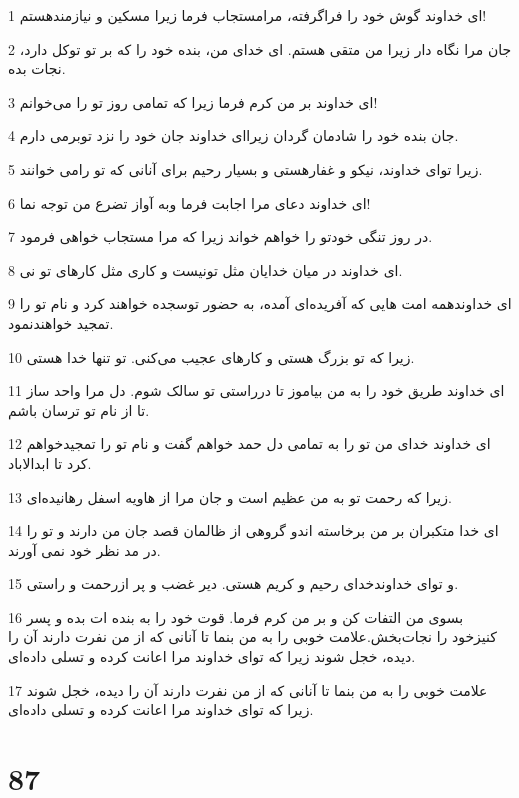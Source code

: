 \par 1 ای خداوند گوش خود را فراگرفته، مرامستجاب فرما زیرا مسکین و نیازمندهستم!
\par 2 جان مرا نگاه دار زیرا من متقی هستم. ای خدای من، بنده خود را که بر تو توکل دارد، نجات بده.
\par 3 ‌ای خداوند بر من کرم فرما زیرا که تمامی روز تو را می‌خوانم!
\par 4 جان بنده خود را شادمان گردان زیرا‌ای خداوند جان خود را نزد توبرمی دارم.
\par 5 زیرا تو‌ای خداوند، نیکو و غفارهستی و بسیار رحیم برای آنانی که تو رامی خوانند.
\par 6 ‌ای خداوند دعای مرا اجابت فرما وبه آواز تضرع من توجه نما!
\par 7 در روز تنگی خودتو را خواهم خواند زیرا که مرا مستجاب خواهی فرمود.
\par 8 ‌ای خداوند در میان خدایان مثل تونیست و کاری مثل کارهای تو نی.
\par 9 ‌ای خداوندهمه امت هایی که آفریده‌ای آمده، به حضور توسجده خواهند کرد و نام تو را تمجید خواهندنمود.
\par 10 زیرا که تو بزرگ هستی و کارهای عجیب می‌کنی. تو تنها خدا هستی.
\par 11 ‌ای خداوند طریق خود را به من بیاموز تا درراستی تو سالک شوم. دل مرا واحد ساز تا از نام تو ترسان باشم.
\par 12 ‌ای خداوند خدای من تو را به تمامی دل حمد خواهم گفت و نام تو را تمجیدخواهم کرد تا ابدالاباد.
\par 13 زیرا که رحمت تو به من عظیم است و جان مرا از هاویه اسفل رهانیده‌ای.
\par 14 ‌ای خدا متکبران بر من برخاسته اندو گروهی از ظالمان قصد جان من دارند و تو را در مد نظر خود نمی آورند.
\par 15 و تو‌ای خداوندخدای رحیم و کریم هستی. دیر غضب و پر ازرحمت و راستی.
\par 16 بسوی من التفات کن و بر من کرم فرما. قوت خود را به بنده ات بده و پسر کنیزخود را نجات‌بخش.علامت خوبی را به من بنما تا آنانی که از من نفرت دارند آن را دیده، خجل شوند زیرا که تو‌ای خداوند مرا اعانت کرده و تسلی داده‌ای.
\par 17 علامت خوبی را به من بنما تا آنانی که از من نفرت دارند آن را دیده، خجل شوند زیرا که تو‌ای خداوند مرا اعانت کرده و تسلی داده‌ای.
 
\chapter{87}

